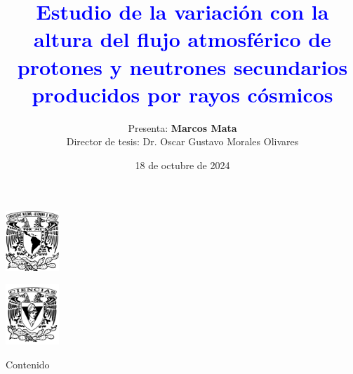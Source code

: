 \documentclass[13pt, aspectratio=169]{beamer}
\title{\Large \textcolor{blue}{Estudio de la variación con la altura del flujo atmosférico de protones y neutrones secundarios producidos por rayos cósmicos}}
\author{Presenta: \textbf{Marcos Mata} \\ 
    \scriptsize Director de tesis: Dr. Oscar Gustavo Morales Olivares}
\institute{
    \inst{
        \footnotesize Universidad Nacional Autónoma de México 
    }
    \inst{
        \footnotesize Facultad de Ciencias
    }
}
\date{\scriptsize 18 de octubre de 2024}
\begin{document}
\begin{frame}[plain]
    \begin{minipage}[t]{0.1\linewidth}
        \includegraphics[width=2cm]{Figures/unam.pdf}
    \end{minipage}
    \hfill
    \begin{minipage}[t]{0.1\linewidth}
        \includegraphics[width=2cm]{Figures/ciencias.pdf}
    \end{minipage}
    \vspace{1cm}
    \titlepage
\end{frame}



    
    \begin{frame}{Contenido} %
        \tableofcontents
    \end{frame}
    
	
    
	
	
	
	
    
	
\end{document}
